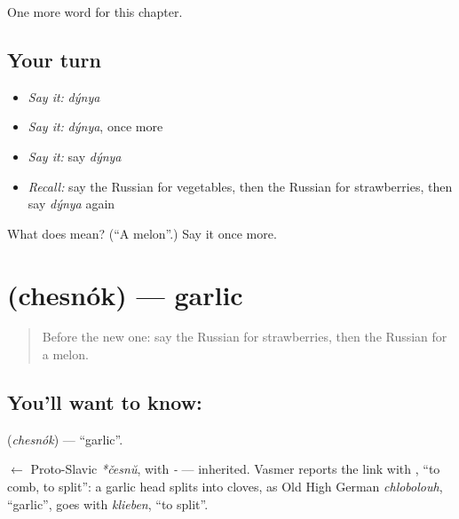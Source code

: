\begin{grammarlens}[title={What you've built}]
One more word for this chapter.
\end{grammarlens}

\subsection*{Your turn}
\begin{itemize}
\raggedright
  \item \emph{Say it:} \emph{dýnya}
  \item \emph{Say it:} \emph{dýnya}, once more
  \item \emph{Say it:} say \emph{dýnya}
  \item \emph{Recall:} say the Russian for vegetables, then the Russian for strawberries, then say \emph{dýnya} again
\end{itemize}

\begin{tcolorbox}[breakable,colback=teal!4,colframe=teal!35!black,title={Before you move on}]
What does  mean? (\textquotedblleft{}A melon\textquotedblright{}.) Say it once more.
\end{tcolorbox}
\section[\texorpdfstring{\ru{чеснок} (chesnók)}{чеснок (chesnók)}]{ (chesnók) — garlic}

\label{lesson:RU-C104-garlic}



\begin{quote}
Before the new one: say the Russian for strawberries, then the Russian for a melon.
\end{quote}

\subsection*{You'll want to know: }
\textbf{} (\emph{chesnók}) — \textquotedblleft{}garlic\textquotedblright{}.

\begin{cousinweb}
\textbf{} $\leftarrow$ Proto-Slavic \emph{*česnŭ}, with \emph{-} — inherited. Vasmer reports the link with \emph{}, \textquotedblleft{}to comb, to split\textquotedblright{}: a garlic head splits into cloves, as Old High German \emph{chlobolouh}, \textquotedblleft{}garlic\textquotedblright{}, goes with \emph{klieben}, \textquotedblleft{}to split\textquotedblright{}.
\end{cousinweb}

